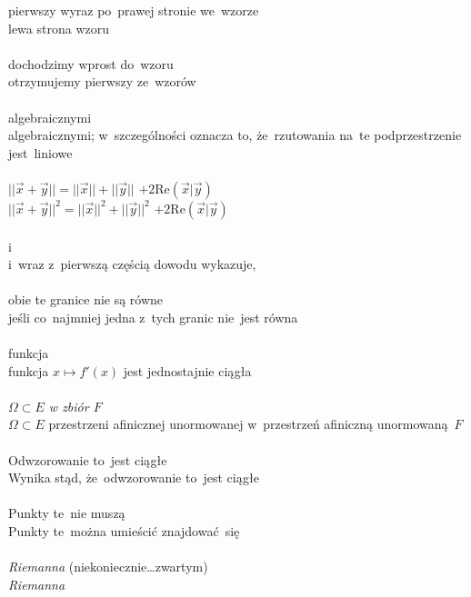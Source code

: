 \documentclass[a4paper,11pt]{article}
\begin{document}
\Jest pierwszy wyraz po~prawej stronie we~wzorze \\
\Pow  lewa strona wzoru \\
 \\
\Jest dochodzimy wprost do~wzoru \\
\Pow  otrzymujemy pierwszy ze~wzorów \\
 \\
\Jest algebraicznymi \\
\Pow algebraicznymi; w~szczególności oznacza to, że~rzutowania na~te
podprzestrzenie jest~liniowe \\
 \\
\Jest
$|| \vec{ x } + \vec{ y } || = || \vec{ x } || + || \vec{ y } ||$
$+ 2 \mathrm{Re}( \vec{ x } | \vec{ y } )$ \\
\Pow $|| \vec{ x } + \vec{ y } ||^{ 2 } = || \vec{ x } ||^{ 2 }
+ || \vec{ y } ||^{ 2 }$ $+ 2 \mathrm{Re}( \vec{ x } | \vec{ y } )$ \\
 \\
\Jest i \\
\Pow i~wraz z~pierwszą częścią dowodu wykazuje, \\
 \\
\Jest obie te granice nie są równe \\
\Pow  jeśli co~najmniej jedna z~tych granic nie~jest równa \\
 \\
\Jest funkcja \\
\Pow  funkcja $x \mapsto f'( x )$ jest jednostajnie ciągła \\
 \\
\Jest \emph{$\Omega \subset E$ w zbiór $F$} \\
\Pow $\Omega \subset E$ przestrzeni afinicznej unormowanej
w~przestrzeń
afiniczną unormowaną~$F$ \\
 \\
\Jest Odwzorowanie to~jest ciągłe \\
\Pow  Wynika stąd, że~odwzorowanie to~jest ciągłe \\
 \\
\Jest Punkty te~nie muszą \\
\Pow  Punkty te~można umieścić znajdować~się \\
 \\
\Jest \emph{Riemanna} (niekoniecznie\ldots zwartym) \\
\Pow  \emph{Riemanna} \\
\end{document}
